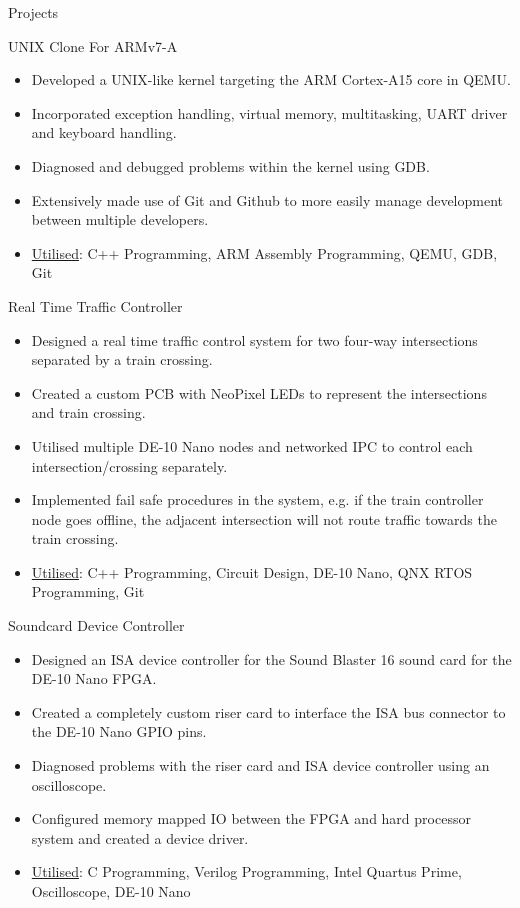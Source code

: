 \documentclass[]{mcdowellcv}
\begin{document}
	\begin{cvsection}{Projects}
		\begin{cvsubsection}{UNIX Clone For ARMv7-A}{}{}
			\begin{itemize}
				\item Developed a UNIX-like kernel targeting the ARM Cortex-A15 core in QEMU.
				\item Incorporated exception handling, virtual memory, multitasking, UART driver and keyboard handling.
				\item Diagnosed and debugged problems within the kernel using GDB.
				\item Extensively made use of Git and Github to more easily manage development between multiple developers.
				\item \underline{Utilised}: C++ Programming, ARM Assembly Programming, QEMU, GDB, Git
			\end{itemize}
		\end{cvsubsection}

		\begin{cvsubsection}{Real Time Traffic Controller}{}{}
			\begin{itemize}
				\item Designed a real time traffic control system for two four-way intersections separated by a train crossing.
				\item Created a custom PCB with NeoPixel LEDs to represent the intersections and train crossing.
				\item Utilised multiple DE-10 Nano nodes and networked IPC to control each intersection/crossing separately.
				\item Implemented fail safe procedures in the system, e.g. if the train controller node goes offline, the adjacent intersection will not route traffic towards the train crossing.
				\item \underline{Utilised}: C++ Programming, Circuit Design, DE-10 Nano, QNX RTOS Programming, Git
			\end{itemize}
		\end{cvsubsection}

		\begin{cvsubsection}{Soundcard Device Controller}{}{}
			\begin{itemize}
				\item Designed an ISA device controller for the Sound Blaster 16 sound card for the DE-10 Nano FPGA.
				\item Created a completely custom riser card to interface the ISA bus connector to the DE-10 Nano GPIO pins.
				\item Diagnosed problems with the riser card and ISA device controller using an oscilloscope.
				\item Configured memory mapped IO between the FPGA and hard processor system and created a device driver.
				\item \underline{Utilised}: C Programming, Verilog Programming, Intel Quartus Prime, Oscilloscope, DE-10 Nano
			\end{itemize}
		\end{cvsubsection}


\end{cvsection}
\end{document}

